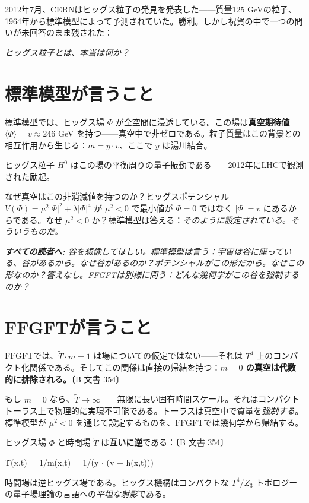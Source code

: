 \documentclass[11pt,openany]{book}
\newenvironment{laierspur}{%
  \par\vspace{4pt}%
  \noindent\small\itshape\color{blue!60!black}%
  \textbf{すべての読者へ:}\enspace\ignorespaces}{%
  \par\vspace{4pt}\normalsize\normalfont\normalcolor}
\begin{document}
2012年7月、CERNはヒッグス粒子の発見を発表した——質量125 GeVの粒子、1964年から標準模型によって予測されていた。勝利。しかし祝賀の中で一つの問いが未回答のまま残された：

\textit{ヒッグス粒子とは、本当は何か？}

\section*{標準模型が言うこと}

標準模型では、ヒッグス場 $\Phi$ が全空間に浸透している。この場は\textbf{真空期待値} $\langle\Phi\rangle = v \approx 246$ GeV を持つ——真空中で非ゼロである。粒子質量はこの背景との相互作用から生じる：$m = y \cdot v$、ここで $y$ は湯川結合。

ヒッグス粒子 $H^0$ はこの場の平衡周りの量子振動である——2012年にLHCで観測された励起。

なぜ真空はこの非消滅値を持つのか？ヒッグスポテンシャル $V(\Phi) = \mu^2|\Phi|^2 + \lambda|\Phi|^4$ が $\mu^2 < 0$ で最小値が $\Phi = 0$ ではなく $|\Phi| = v$ にあるからである。なぜ $\mu^2 < 0$ か？標準模型は答える：\textit{そのように設定されている。そういうものだ。}

\begin{laierspur}
谷を想像してほしい。標準模型は言う：宇宙は谷に座っている、谷があるから。なぜ谷があるのか？ポテンシャルがこの形だから。なぜこの形なのか？答えなし。FFGFTは別様に問う：どんな幾何学がこの谷を強制するのか？
\end{laierspur}

\section*{FFGFTが言うこと}

FFGFTでは、$\tilde{T} \cdot m = 1$ は場についての仮定ではない——それは $T^4$ 上のコンパクト化関係である。そしてこの関係は直接の帰結を持つ：\textbf{$m = 0$ の真空は代数的に排除される。}〔B 文書 354〕

もし $m = 0$ なら、$\tilde{T} \to \infty$——無限に長い固有時間スケール。それはコンパクトトーラス上で物理的に実現不可能である。トーラスは真空中で質量を\textit{強制する}。標準模型が $\mu^2 < 0$ を通じて設定するものを、FFGFTでは幾何学から帰結する。

ヒッグス場 $\Phi$ と時間場 $\tilde{T}$ は\textbf{互いに逆}である：〔B 文書 354〕

T̃(x,t) = 1/m(x,t) = 1/(y $\cdot$ (v + h(x,t)))

時間場は逆ヒッグス場である。ヒッグス機構はコンパクトな $T^4/Z_3$ トポロジーの量子場理論の言語への\textit{平坦な射影}である。
\end{document}
